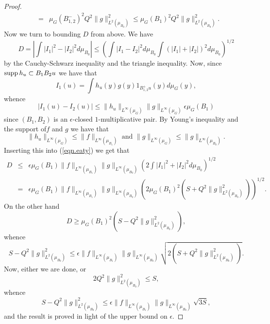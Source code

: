 \documentclass[12pt]{amsart}
\numberwithin{equation}{section}
\theoremstyle{plain}
\theoremstyle{definition}
\renewcommand{\leq}{\leqslant}
\renewcommand{\geq}{\geqslant}
\providecommand{\supp}{\mathop{\rm supp}\nolimits}
\begin{document}
\begin{proof}
\begin{eqnarray*}
& = & \mu_G(B_{1,2}^-)^2Q^2\|g\|_{L^2(\mu_{B_0})}^2 \leq \mu_G(B_1)^2Q^2\|g\|_{L^2(\mu_{B_0})}^2.
\end{eqnarray*}
Now we turn to bounding $D$ from above.  We have
\begin{equation}\label{eqn.eaty}
D =| \int{|I_1|^2 - |I_2|^2d\mu_{B_0}}| \leq \left(\int{|I_1 - I_2|^2d\mu_{B_0}}\int{(|I_1|+|I_2|)^2d\mu_{B_0}}\right)^{1/2}
\end{equation}
by the Cauchy-Schwarz inequality and the triangle inequality.  Now, since $\supp h_u \subset B_1B_2u$ we have that
\begin{equation*}
I_1(u)=\int{h_u(y)g(y)1_{B_{1,2}^+u}(y)d\mu_G(y)},
\end{equation*}
whence
\begin{equation*}
|I_1(u) - I_2(u)| \leq \|h_u\|_{L^\infty(\mu_G)}\|g\|_{L^\infty(\mu_G)}\epsilon \mu_{G}(B_1)
\end{equation*}
since $(B_1,B_2)$ is an $\epsilon$-closed $1$-multiplicative pair. By Young's inequality and the support of$f$ and $g$ we have that
\begin{equation*}
 \|h_u\|_{L^\infty(\mu_G)}\leq \|f\|_{L^\infty(\mu_{B_1})} \textrm{ and } \|g\|_{L^\infty(\mu_G)} \leq \|g\|_{L^\infty(\mu_{B_0})}.
\end{equation*}
Inserting this into (\ref{eqn.eaty}) we get that
\begin{eqnarray*}
D& \leq& \epsilon\mu_{G}(B_1)\|f\|_{L^\infty(\mu_{B_1})}\|g\|_{L^\infty(\mu_{B_0})}\left(2\int{|I_1|^2+|I_2|^2d\mu_{B_0}}\right)^{1/2}\\ & = & \epsilon \mu_G(B_1)\|f\|_{L^\infty(\mu_{B_1})}\|g\|_{L^\infty(\mu_{B_0})}(2\mu_G(B_1)^2(S + Q^2\|g\|_{L^2(\mu_{B_0})}^2))^{1/2}.
\end{eqnarray*}
On the other hand
\begin{equation*}
D \geq \mu_G(B_1)^2(S - Q^2\|g\|_{L^2(\mu_{B_0})}^2),
\end{equation*}
whence
\begin{equation*}
S - Q^2\|g\|_{L^2(\mu_{B_0})}^2 \leq \epsilon\|f\|_{L^\infty(\mu_{B_1})}\|g\|_{L^\infty(\mu_{B_0})} \sqrt{2(S+Q^2\|g\|_{L^2(\mu_{B_0})}^2)}.
\end{equation*}
Now, either we are done, or
\begin{equation*}
2Q^2\|g\|_{L^2(\mu_{B_0})}^2 \leq S,
\end{equation*}
whence
\begin{equation*}
S - Q^2\|g\|_{L^2(\mu_{B_0})}^2 \leq \epsilon\|f\|_{L^\infty(\mu_{B_1})}\|g\|_{L^\infty(\mu_{B_0})} \sqrt{3S},
\end{equation*}
and the result is proved in light of the upper bound on $\epsilon$.
\end{proof}
\end{document}
